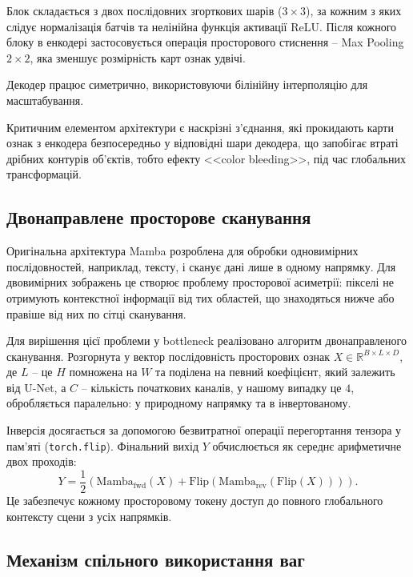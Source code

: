             Блок складається з двох послідовних згорткових шарів ($3 \times 3$), за кожним з яких слідує нормалізація батчів та нелінійна функція активації ReLU.
            Після кожного блоку в енкодері застосовується операція просторового стиснення -- Max Pooling $2 \times 2$, яка зменшує розмірність карт ознак удвічі.
            
            Декодер працює симетрично, використовуючи білінійну інтерполяцію для масштабування.
            
            Критичним елементом архітектури є наскрізні з'єднання, які прокидають карти ознак з енкодера безпосередньо у відповідні шари декодера,
            що запобігає втраті дрібних контурів об'єктів, тобто ефекту <<color bleeding>>, під час глобальних трансформацій.

        \subsection{Двонаправлене просторове сканування}
            Оригінальна архітектура Mamba розроблена для обробки одновимірних послідовностей, наприклад, тексту, і сканує дані лише в одному напрямку.
            Для двовимірних зображень це створює проблему просторової асиметрії: пікселі не отримують контекстної інформації від тих областей, що знаходяться нижче або правіше від них по сітці сканування.

            Для вирішення цієї проблеми у bottleneck реалізовано алгоритм двонаправленого сканування.
            Розгорнута у вектор послідовність просторових ознак $X \in \mathbb{R}^{B \times L \times D}$, де $L$ -- це $H$ помножена на $W$ та поділена на певний коефіцієнт, який залежить від U-Net, а $C$ -- кількість початкових каналів, у нашому випадку це $4$, обробляється паралельно: у природному напрямку та в інвертованому.
            
            Інверсія досягається за допомогою безвитратної операції перегортання тензора у пам'яті (\texttt{torch.flip}).
            Фінальний вихід $Y$ обчислюється як середнє арифметичне двох проходів:
            \begin{equation*}
                Y = \frac{1}{2} \left( \mathrm{Mamba}_{\mathrm{fwd}}(X) + \mathrm{Flip}(\mathrm{Mamba}_{\mathrm{rev}}(\mathrm{Flip}(X))) \right).
            \end{equation*}
            Це забезпечує кожному просторовому токену доступ до повного глобального контексту сцени з усіх напрямків.

        \subsection{Механізм спільного використання ваг}


